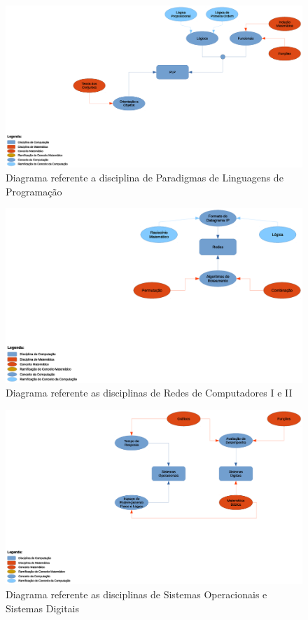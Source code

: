 \documentclass[12pt,a4paper]{article}
\begin{document}
\begin{figure}[htb]
	\centering
	\includegraphics[scale=0.35]{imagens/PLP.eps} 
	\flushleft
	\caption{Diagrama referente a disciplina de Paradigmas de Linguagens de Programação}
	\label{fig:diagramaPLP}
\end{figure}

\begin{figure}[htb]
	\centering
	\includegraphics[scale=0.35]{imagens/redes.eps} 
	\flushleft	
	\caption{Diagrama referente as disciplinas de Redes de Computadores I e II}
	\label{fig:diagramaRedes}
\end{figure}

\begin{figure}
	\centering
	\includegraphics[scale=0.35]{imagens/SD.eps} 
	\flushleft
	\caption{Diagrama referente as disciplinas de Sistemas Operacionais e Sistemas Digitais}
	\label{fig:diagramaSD}
\end{figure}
\end{document}
